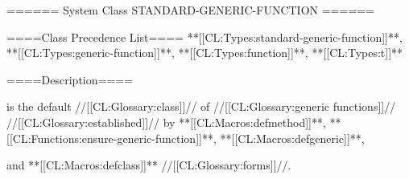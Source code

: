 ====== System Class STANDARD-GENERIC-FUNCTION ======

====Class Precedence List==== **[[CL:Types:standard-generic-function]]**, **[[CL:Types:generic-function]]**, **[[CL:Types:function]]**, **[[CL:Types:t]]**

====Description====

 is the default //[[CL:Glossary:class]]// of //[[CL:Glossary:generic functions]]// //[[CL:Glossary:established]]// by **[[CL:Macros:defmethod]]**, **[[CL:Functions:ensure-generic-function]]**, **[[CL:Macros:defgeneric]]**,

and **[[CL:Macros:defclass]]** //[[CL:Glossary:forms]]//.

 
